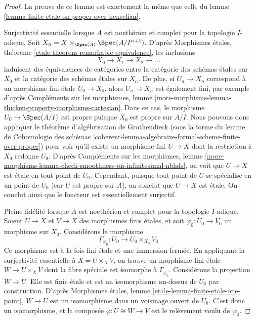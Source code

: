 \begin{proof}
La preuve de ce lemme est exactement la même que celle du
lemme \ref{lemma-finite-etale-on-proper-over-henselian}.

\medskip\noindent
Surjectivité essentielle lorsque $A$ est noethérien et complet pour la topologie $I$-adique.
Soit $X_n = X \times_{\Spec(A)} \Spec(A/I^{n + 1})$.
D'après Morphismes étales, théorème \ref{etale-theorem-remarkable-equivalence},
les inclusions
$$
X_0 \to X_1 \to X_2 \to \ldots
$$
induisent des équivalences de catégories entre la catégorie
des schémas étales sur $X_0$ et la catégorie des schémas
étales sur $X_n$.
De plus, si $U_n \to X_n$ correspond à un morphisme fini étale
$U_0 \to X_0$, alors $U_n \to X_n$ est également fini, par exemple
d'après Compléments sur les morphismes, lemme
\ref{more-morphisms-lemma-thicken-property-morphisms-cartesian}.
Dans ce cas, le morphisme $U_0 \to \Spec(A/I)$
est propre puisque $X_0$ est propre sur $A/I$. Nous pouvons donc appliquer
le théorème d'algébrisation de Grothendieck
(sous la forme du
lemme de Cohomologie des schémas
\ref{coherent-lemma-algebraize-formal-scheme-finite-over-proper})
pour voir qu'il existe un morphisme fini $U \to X$ dont la restriction
à $X_0$ redonne $U_0$. D'après Compléments sur les morphismes, lemme
\ref{more-morphisms-lemma-check-smoothness-on-infinitesimal-nbhds},
on voit que $U \to X$ est étale en tout point de $U_0$.
Cependant, puisque tout point de $U$ se spécialise en un point de $U_0$
(car $U$ est propre sur $A$), on conclut que $U \to X$ est étale.
On conclut ainsi que le foncteur est essentiellement surjectif.

\medskip\noindent
Pleine fidélité lorsque $A$ est noethérien et complet pour la topologie $I$-adique.
Soient $U \to X$ et $V \to X$ des morphismes finis étales, et
soit $\varphi_0 : U_0 \to V_0$ un morphisme sur $X_0$. Considérons
le morphisme
$$
\Gamma_{\varphi_0} : U_0 \longrightarrow U_0 \times_{X_0} V_0
$$
Ce morphisme est à la fois fini étale et une immersion fermée.
En appliquant la surjectivité essentielle à $X = U \times_X V$, on trouve
un morphisme fini étale $W \to U \times_X V$ dont la fibre spéciale
est isomorphe à $\Gamma_{\varphi_0}$. Considérons la projection
$W \to U$. Elle est finie étale et est un isomorphisme au-dessus de $U_0$ par
construction. D'après Morphismes étales, lemme
\ref{etale-lemma-finite-etale-one-point},
$W \to U$ est un isomorphisme dans un voisinage ouvert de $U_0$.
C'est donc un isomorphisme, et la composée $\varphi : U \cong W \to V$
est le relèvement voulu de $\varphi_0$.


\end{proof}
